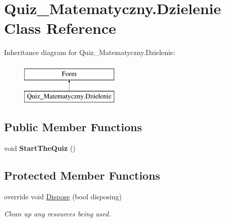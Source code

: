 \hypertarget{class_quiz___matematyczny_1_1_dzielenie}{}\section{Quiz\+\_\+\+Matematyczny.\+Dzielenie Class Reference}
\label{class_quiz___matematyczny_1_1_dzielenie}
Inheritance diagram for Quiz\+\_\+\+Matematyczny.\+Dzielenie\+:\begin{figure}[H]
\begin{center}
\leavevmode
\includegraphics[height=2.000000cm]{class_quiz___matematyczny_1_1_dzielenie}
\end{center}
\end{figure}
\subsection*{Public Member Functions}
\begin{DoxyCompactItemize}
\item 
\mbox{\label{class_quiz___matematyczny_1_1_dzielenie_a43a6381446e3e0df92fde2038746d705}} 
void {\bfseries Start\+The\+Quiz} ()
\end{DoxyCompactItemize}
\subsection*{Protected Member Functions}
\begin{DoxyCompactItemize}
\item 
override void \mbox{\hyperlink{class_quiz___matematyczny_1_1_dzielenie_a80ea648f1e76f20efda57b1d6f015a60}{Dispose}} (bool disposing)
\begin{DoxyCompactList}\small\item\em Clean up any resources being used. \end{DoxyCompactList}\end{DoxyCompactItemize}
